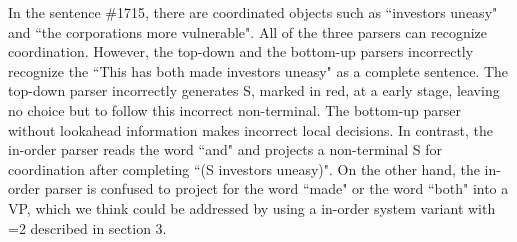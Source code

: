 \documentclass[11pt,letterpaper]{article}
\begin{document}
In the sentence \#1715, there are coordinated objects such as ``investors uneasy" and ``the corporations more vulnerable".
All of the three parsers can recognize coordination.
However, the top-down and the bottom-up parsers incorrectly recognize the ``This has both made investors uneasy" as a complete sentence.
The top-down parser incorrectly generates S, marked in red, at a early stage, leaving no choice but to follow this incorrect non-terminal.
The bottom-up parser without lookahead information makes incorrect local decisions.
In contrast, the in-order parser reads the word ``and" and projects a non-terminal S for coordination after completing ``(S investors uneasy)".
On the other hand, the in-order parser is confused to project for the word ``made" or the word ``both" into a VP, which we think could be addressed by using a in-order system variant with =2 described in section 3.
\end{document}
